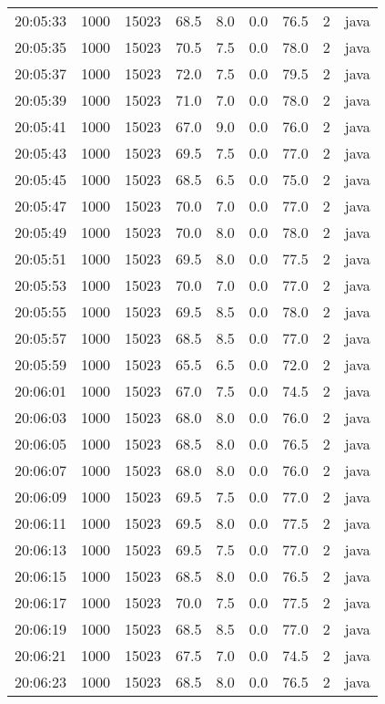 \documentclass[11pt]{article}
\begin{document}
\begin{table}[htbp]
\begin{tabular}{rrrrrrrrl}
20:05:33 & 1000 & 15023 & 68.5 & 8.0 & 0.0 & 76.5 & 2 & java\\
20:05:35 & 1000 & 15023 & 70.5 & 7.5 & 0.0 & 78.0 & 2 & java\\
20:05:37 & 1000 & 15023 & 72.0 & 7.5 & 0.0 & 79.5 & 2 & java\\
20:05:39 & 1000 & 15023 & 71.0 & 7.0 & 0.0 & 78.0 & 2 & java\\
20:05:41 & 1000 & 15023 & 67.0 & 9.0 & 0.0 & 76.0 & 2 & java\\
20:05:43 & 1000 & 15023 & 69.5 & 7.5 & 0.0 & 77.0 & 2 & java\\
20:05:45 & 1000 & 15023 & 68.5 & 6.5 & 0.0 & 75.0 & 2 & java\\
20:05:47 & 1000 & 15023 & 70.0 & 7.0 & 0.0 & 77.0 & 2 & java\\
20:05:49 & 1000 & 15023 & 70.0 & 8.0 & 0.0 & 78.0 & 2 & java\\
20:05:51 & 1000 & 15023 & 69.5 & 8.0 & 0.0 & 77.5 & 2 & java\\
20:05:53 & 1000 & 15023 & 70.0 & 7.0 & 0.0 & 77.0 & 2 & java\\
20:05:55 & 1000 & 15023 & 69.5 & 8.5 & 0.0 & 78.0 & 2 & java\\
20:05:57 & 1000 & 15023 & 68.5 & 8.5 & 0.0 & 77.0 & 2 & java\\
20:05:59 & 1000 & 15023 & 65.5 & 6.5 & 0.0 & 72.0 & 2 & java\\
20:06:01 & 1000 & 15023 & 67.0 & 7.5 & 0.0 & 74.5 & 2 & java\\
20:06:03 & 1000 & 15023 & 68.0 & 8.0 & 0.0 & 76.0 & 2 & java\\
20:06:05 & 1000 & 15023 & 68.5 & 8.0 & 0.0 & 76.5 & 2 & java\\
20:06:07 & 1000 & 15023 & 68.0 & 8.0 & 0.0 & 76.0 & 2 & java\\
20:06:09 & 1000 & 15023 & 69.5 & 7.5 & 0.0 & 77.0 & 2 & java\\
20:06:11 & 1000 & 15023 & 69.5 & 8.0 & 0.0 & 77.5 & 2 & java\\
20:06:13 & 1000 & 15023 & 69.5 & 7.5 & 0.0 & 77.0 & 2 & java\\
20:06:15 & 1000 & 15023 & 68.5 & 8.0 & 0.0 & 76.5 & 2 & java\\
20:06:17 & 1000 & 15023 & 70.0 & 7.5 & 0.0 & 77.5 & 2 & java\\
20:06:19 & 1000 & 15023 & 68.5 & 8.5 & 0.0 & 77.0 & 2 & java\\
20:06:21 & 1000 & 15023 & 67.5 & 7.0 & 0.0 & 74.5 & 2 & java\\
20:06:23 & 1000 & 15023 & 68.5 & 8.0 & 0.0 & 76.5 & 2 & java\\

\end{tabular}
\end{table}
\end{document}
